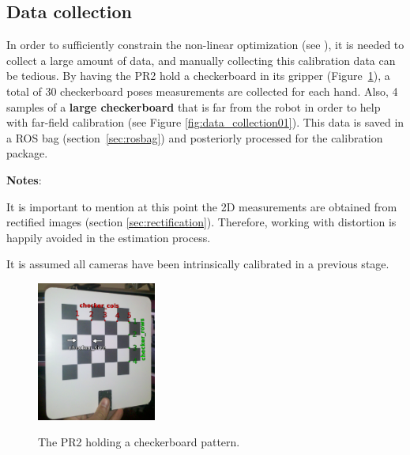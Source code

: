 \subsection{Data collection}

In order to sufficiently constrain the non-linear optimization (see \cite{pr2_calibration_paper}), it is needed to collect a large amount of data, and manually collecting this calibration data can be tedious. By having the PR2 hold a checkerboard in its gripper (Figure~\ref{fig:pr2_holdind_cb}), a total of 30 checkerboard poses measurements are collected for each hand. Also, 4 samples of a \textbf{large checkerboard} that is far from the robot in order to help with far-field calibration (see Figure \ref{fig:data_collection01}). This data is saved in a ROS bag (section~\ref{sec:rosbag}) and posteriorly processed for the calibration package.

\noindent

\textbf{Notes}:
\begin{itemize*}
  \item It is important to mention at this point the 2D measurements are obtained from rectified images (section \ref{sec:rectification}). Therefore, working with distortion is happily avoided in the estimation process.
  \item It is assumed all cameras have been intrinsically calibrated in a previous stage.
\end{itemize*}


\begin{figure}[!htbp]
  \centering
  \subfigure
  {
    \includegraphics[width=0.35\textwidth]{images/checkerboard01.png}
  }
  \caption{The PR2 holding a checkerboard pattern.}
 \label{fig:pr2_holdind_cb}
\end{figure}


